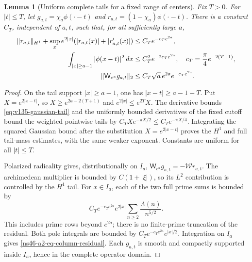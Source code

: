 \documentclass[11pt]{article}
\newtheorem{lemma}[theorem]{Lemma}
\theoremstyle{remark}
\begin{document}
\begin{lemma}[Uniform complete tails for a fixed range of centers]
\label{ns46-a2-lem-fixed-centers}
Fix $T>0$. For $|t|\le T$, let
$g_{a,t}=\chi_a\phi(\cdot-t)$ and
$r_{a,t}=(1-\chi_a)\phi(\cdot-t)$. There is a constant $C_T$,
independent of $a,t$, such that, for all sufficiently large $a$,
\begin{align}
 \|r_{a,t}\|_{H^1}
  +\sup_x e^{2|x|}(|r_{a,t}(x)|+|r'_{a,t}(x)|)
 &\le C_Te^{-c_Te^{2a}},\notag\\
 \int_{|x|\ge a-1}|\phi(x-t)|^2\,dx
 &\le C_T^2e^{-2c_Te^{2a}},
 \quad c_T=\frac\pi4e^{-2(T+1)},
 \label{ns46-a2-eq-tails}\\
 \|\mathsf W_{e^a}g_{a,t}\|_2
 &\le C_T\sqrt a\,e^{2a}e^{-c_Te^{2a}}.
 \label{ns46-a2-eq-column-residual}
\end{align}
\end{lemma}
\begin{proof}
On the tail support $|x|\ge a-1$, one has
$|x-t|\ge a-1-T$. Put $X=e^{2|x-t|}$, so
$X\ge e^{2a-2(T+1)}$ and $e^{2|x|}\le e^{2T}X$.
The derivative bounds \eqref{eq:v135-gaussian-tail} and the uniformly
bounded derivatives of the fixed cutoff bound the weighted pointwise
tails by $C_TXe^{-\pi X/2}\le C_Te^{-\pi X/4}$.
Integrating the squared Gaussian bound after the substitution
$X=e^{2|x-t|}$ proves the $H^1$ and full tail-mass estimates, with
the same weaker exponent. Constants are uniform for all $|t|\le T$.

Polarized radicality gives, distributionally on $I_a$,
$\mathsf W_{e^a}g_{a,t}=-\mathcal W r_{a,t}$.
The archimedean multiplier is bounded by $C(1+|\xi|)$, so its
$L^2$ contribution is controlled by the $H^1$ tail. For $x\in I_a$,
each of the two full prime sums is bounded by
\[
 C_Te^{-c_Te^{2a}}e^{2|x|}
         \sum_{n\ge2}\frac{\Lambda(n)}{n^{5/2}}.
\]
This includes prime rows beyond $e^{2a}$; there is no finite-prime
truncation of the residual. Both pole integrals are bounded by
$C_Te^{-c_Te^{2a}}e^{|x|/2}$. Integration on $I_a$ gives
\eqref{ns46-a2-eq-column-residual}. Each $g_{a,t}$ is smooth and
compactly supported inside $I_a$, hence in the complete operator domain.
\end{proof}
\end{document}
